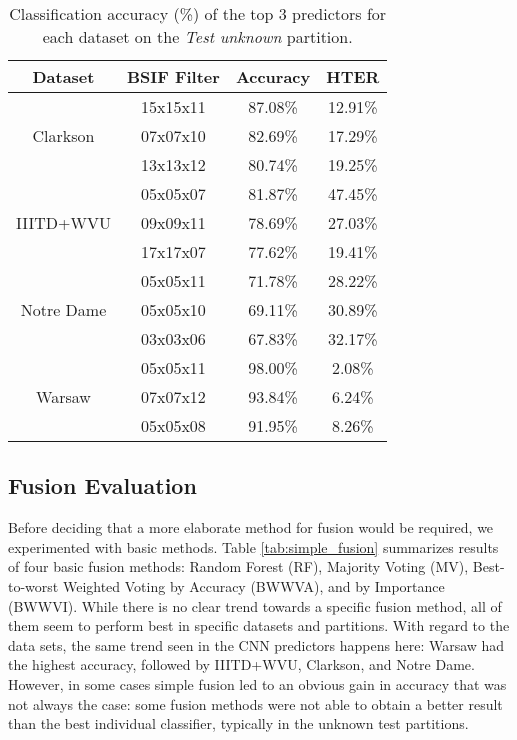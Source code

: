 \begin{table}[!b]
\centering
\caption{Classification accuracy (\%) of the top 3 predictors for each dataset on the \textit{Test unknown} partition.}
\label{tab:individual_top3}
\begin{tabular}{cccc}
\hline
Dataset                     & BSIF Filter & Accuracy & HTER    \\ \hline \hline
\multirow{3}{*}{Clarkson}   & 15x15x11    & 87.08\%  & 12.91\% \\
                            & 07x07x10    & 82.69\%  & 17.29\% \\
                            & 13x13x12    & 80.74\%  & 19.25\% \\ \midrule
\multirow{3}{*}{IIITD+WVU}  & 05x05x07    & 81.87\%  & 47.45\% \\
                            & 09x09x11    & 78.69\%  & 27.03\% \\
                            & 17x17x07    & 77.62\%  & 19.41\% \\ \midrule
\multirow{3}{*}{Notre Dame} & 05x05x11    & 71.78\%  & 28.22\% \\
                            & 05x05x10    & 69.11\%  & 30.89\% \\
                            & 03x03x06    & 67.83\%  & 32.17\% \\ \midrule
\multirow{3}{*}{Warsaw}     & 05x05x11    & 98.00\%  & 2.08\% \\ 
                            & 07x07x12    & 93.84\%  & 6.24\% \\
                            & 05x05x08    & 91.95\%  & 8.26\% \\
\hline
\end{tabular}
\end{table}

\subsection{Fusion Evaluation}
\label{sec:eval_simple_fusion}

Before deciding that a more elaborate method for fusion would be required, we experimented with basic methods. Table \ref{tab:simple_fusion} summarizes results of four basic fusion methods: Random Forest (RF), Majority Voting (MV), Best-to-worst Weighted Voting by Accuracy (BWWVA), and by Importance (BWWVI).
%
While there is no clear trend towards a specific fusion method, all of them seem to perform best in specific datasets and partitions. With regard to the data sets, the same trend seen in the CNN predictors happens here: Warsaw had the highest accuracy, followed by IIITD+WVU, Clarkson, and Notre Dame. However, in some cases simple fusion led to an obvious gain in accuracy that was not always the case: some fusion methods were not able to obtain a better result than the best individual classifier, typically in the unknown test partitions.

